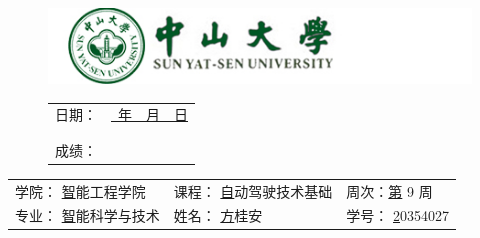 \documentclass[UTF8]{ctexart}
\begin{document}
\renewcommand{\refname}{\centerline{参考文献}}
\renewcommand{\tablename}{表}
\renewcommand{\arraystretch}{1.3}
\renewcommand{\figurename}{图}



\pagestyle{fancy}

\renewcommand{\today}{\number\year~年~\number\month~月~\number\day~日}
\fancyhead{}
\lhead{\newtitle}
\lfoot{}
\rfoot{}

\newcommand{\grade}{\hspace{3cm}}
\newcommand{\institute}{智能工程学院}
\newcommand{\major}{智能科学与技术}
\newcommand{\name}{方桂安}
\newcommand{\stuid}{20354027}



\newcommand{\course}{自动驾驶技术基础}
\newcommand{\newtitle}{第 9 周}


\thispagestyle{empty} %

\begin{figure}[h]
  \begin{minipage}{0.6\linewidth}
    \centerline{\includegraphics[width=\linewidth]{head3.jpg}} %
  \end{minipage}
  \hfill
  \begin{minipage}{.4\linewidth}
    \raggedleft
    \begin{tabular*}{.8\linewidth}{ll}
      日期： & \underline{\today} \\
      \\
      \\
      成绩： & \underline\grade
    \end{tabular*}
  \end{minipage}
\end{figure}

\begin{table}[!htbp]
  \centering
  \begin{tabular*}{\linewidth}{lll}
    \quad 学院： \underline\institute   &  \quad\quad\quad 课程： \underline\course & \quad\quad\quad 周次：\underline\newtitle  \\
    \quad 专业： \underline\major& \quad\quad\quad 姓名： \underline\name & \quad\quad\quad 学号：  \underline\stuid \\
  \end{tabular*}
\end{table}
\end{document}
